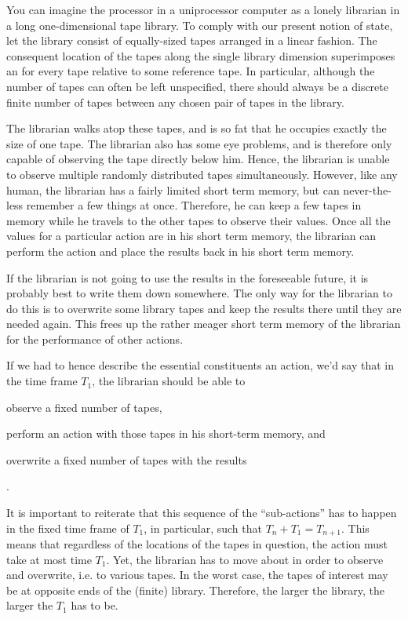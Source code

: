 You can imagine the processor in a uniprocessor computer as a lonely librarian
in a long one-dimensional tape library. To comply with our present notion of
state, let the library consist of equally-sized tapes arranged in a linear
fashion. The consequent location of the tapes along the single library
dimension superimposes an  for every tape relative to some
reference tape. In particular, although the number of tapes can often be left
unspecified, there should always be a discrete finite number of tapes between
any chosen pair of tapes in the library.

The librarian walks atop these tapes, and is so fat that he occupies exactly
the size of one tape. The librarian also has some eye problems, and is
therefore only capable of observing the tape directly below him. Hence, the
librarian is unable to observe multiple randomly distributed tapes
simultaneously. However, like any human, the librarian has a fairly limited
short term memory, but can never-the-less remember a few things at once.
Therefore, he can keep a few tapes in memory while he travels to the other
tapes to observe their values. Once all the values for a particular action are
in his short term memory, the librarian can perform the action and place the
results back in his short term memory.

If the librarian is not going to use the results in the foreseeable future, it
is probably best to write them down somewhere. The only way for the librarian
to do this is to overwrite some library tapes and keep the results there until
they are needed again. This frees up the rather meager short term memory of the
librarian for the performance of other actions.

If we had to hence describe the essential constituents an action, we'd say that
in the time frame $T_1$, the librarian should be able to
\begin{inparaenum}[(1)] \item observe a fixed number of tapes, \item perform an
action with those tapes in his short-term memory, and \item overwrite a fixed
number of tapes with the results\end{inparaenum}.

It is important to reiterate that this sequence of the ``sub-actions'' has to
happen in the fixed time frame of $T_1$, in particular, such that
$T_n+T_1=T_{n+1}$.  This means that regardless of the locations of the tapes in
question, the action must take at most time $T_1$. Yet, the librarian has to
move about in order to observe and overwrite, i.e. to  various
tapes. In the worst case, the tapes of interest may be at opposite ends of the
(finite) library.  Therefore, the larger the library, the larger the $T_1$ has
to be. 


